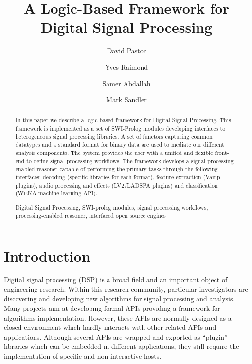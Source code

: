 \documentclass[runningheads]{llncs}
\newcommand{\keywords}[1]{\par\addvspace\baselineskip
\noindent\keywordname\enspace\ignorespaces#1}
\begin{document}
\mainmatter

\title{A Logic-Based Framework for Digital Signal Processing}


\author{David Pastor\and Yves Raimond\and Samer Abdallah\and Mark Sandler}


\maketitle


\begin{abstract}
In this paper we describe a logic-based framework for Digital Signal Processing. This framework is implemented as a set of SWI-Prolog modules developing interfaces to heterogeneous signal processing libraries. A set of functors capturing common datatypes and a standard format for binary data are used to mediate our different analysis components. The system provides the user with a unified and flexible front-end to define signal processing workflows. The framework develops a signal processing-enabled reasoner capable of performing the primary tasks through the following interfaces: decoding (specific libraries for each format), feature extraction (Vamp plugins), audio processing and effects (LV2/LADSPA plugins) and classification (WEKA machine learning API).

\keywords{Digital Signal Processing, SWI-prolog modules, signal processing workflows, processing-enabled reasoner, interfaced open source engines}
\end{abstract}

\section{Introduction}\label{sec:intro}

Digital signal processing (DSP) is a broad field and an important object of engineering research. Within this research community, particular investigators are discovering and developing new algorithms for signal processing and analysis. Many projects aim at developing formal APIs providing a framework for algorithms implementation. However, these APIs are normally designed as a closed environment which hardly interacts with other related APIs and applications. Although several APIs are wrapped and exported as ``plugin'' libraries which can be embedded in different applications, they still require the implementation of specific and non-interactive hosts.
\end{document}
